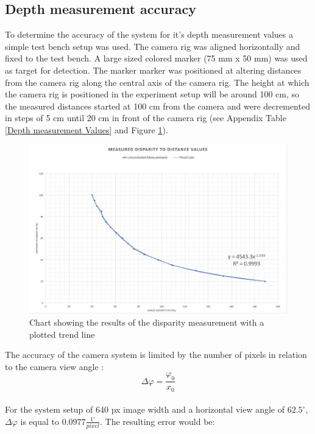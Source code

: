 \subsection{Depth measurement accuracy}
To determine the accuracy of the system for it's depth measurement values a simple test bench setup was used. The camera rig was aligned horizontally and fixed to the test bench. A large sized colored marker (75 mm x 50 mm) was used as target for detection. The marker marker was positioned at altering distances from the camera rig along the central axis of the camera rig. The height at which the camera rig is positioned in the experiment setup will be around 100 cm, so the measured distances started at 100 cm from the camera and were decremented in steps of 5 cm until 20 cm in front of the camera rig (see Appendix Table \ref{Depth measurement Values} and Figure \ref{char:DisparityToDistanceChart}).\\
\begin{figure}[H]
\includegraphics[width=\textwidth]{images/Disparity_to_distance.JPG}
\caption{Chart showing the results of the disparity measurement with a plotted trend line}
\label{char:DisparityToDistanceChart} 
\end{figure}
The accuracy of the camera system is limited by the number of pixels in relation to the camera view angle \cite{JernejMrovlje.2008}:\\
\begin{equation}
\Delta\varphi=\frac{\varphi_0}{x_0}
\end{equation}
\\
For the system setup of 640 px image width and a horizontal view angle of $62.5^\circ$, $\Delta\varphi$ is equal to $0.0977\frac{1^\circ}{pixel}$.
The resulting error would be:\\
